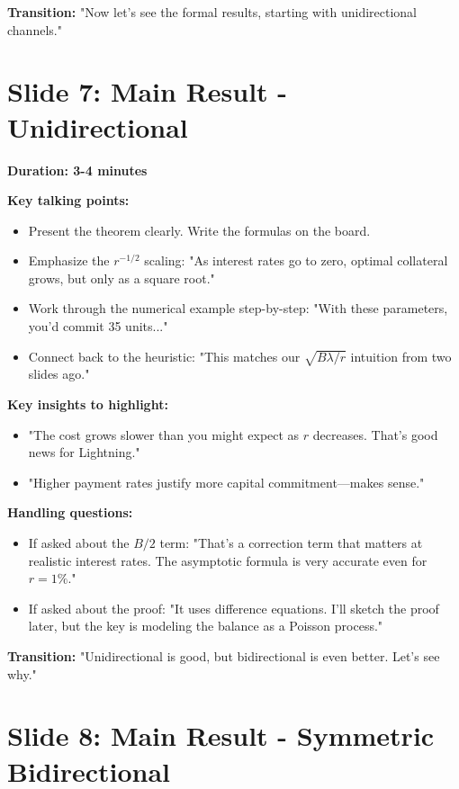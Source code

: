 \documentclass[11pt]{article}
\begin{document}
\textbf{Transition:} "Now let's see the formal results, starting with unidirectional channels."

\section*{Slide 7: Main Result - Unidirectional}

\textbf{Duration: 3-4 minutes}

\textbf{Key talking points:}
\begin{itemize}
    \item Present the theorem clearly. Write the formulas on the board.
    \item Emphasize the $r^{-1/2}$ scaling: "As interest rates go to zero, optimal collateral grows, but only as a square root."
    \item Work through the numerical example step-by-step: "With these parameters, you'd commit 35 units..."
    \item Connect back to the heuristic: "This matches our $\sqrt{B\lambda/r}$ intuition from two slides ago."
\end{itemize}

\textbf{Key insights to highlight:}
\begin{itemize}
    \item "The cost grows slower than you might expect as $r$ decreases. That's good news for Lightning."
    \item "Higher payment rates justify more capital commitment—makes sense."
\end{itemize}

\textbf{Handling questions:}
\begin{itemize}
    \item If asked about the $B/2$ term: "That's a correction term that matters at realistic interest rates. The asymptotic formula is very accurate even for $r = 1\%$."
    \item If asked about the proof: "It uses difference equations. I'll sketch the proof later, but the key is modeling the balance as a Poisson process."
\end{itemize}

\textbf{Transition:} "Unidirectional is good, but bidirectional is even better. Let's see why."

\section*{Slide 8: Main Result - Symmetric Bidirectional}
\end{document}
